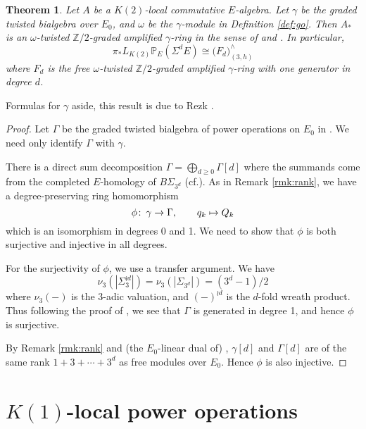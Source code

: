 \documentclass{gtpart}
\newtheorem{thm}{Theorem}
\theoremstyle{definition}
\theoremstyle{remark}
\def\co{\colon\thinspace}
\newcommand{\mb}[1]{\mathbb{#1}}
\newcommand{\cf}{cf.\thinspace}
\newcommand{\BP}{{\mb P}}
\newcommand{\BZ}{{\mb Z}}
\newcommand{\G}{\Gamma}
\newcommand{\g}{\gamma}
\begin{document}
\begin{thm}
\label{thm:gamma}
 Let $A$ be a $K(2)$-local commutative $E$-algebra.  
 Let $\g$ be the graded twisted bialgebra over $E_0$, and $\omega$ be the $\g$-module in Definition \ref{def:go}.  
 Then $A_*$ is an {\em $\omega$-twisted $\BZ/2$-graded amplified $\g$-ring} in the sense of \cite[Section 2]{cong} and \cite[2.5 and 2.6]{h2p2}.  In particular, 
 \[
  \pi_* L_{K(2)} \BP_E (\Sigma^d E) \cong \big( F_d \big)_{(3,h)}^\wedge 
 \]
 where $F_d$ is the free $\omega$-twisted $\BZ/2$-graded amplified $\g$-ring with one generator in degree $d$.  
\end{thm}
Formulas for $\g$ aside, this result is due to Rezk \cite{cong, h2p2}.  
\begin{proof}
 Let $\G$ be the graded twisted bialgebra of power operations on $E_0$ in \cite[Section 6]{cong}.  
 We need only identify $\G$ with $\g$.  

 There is a direct sum decomposition $\G = \bigoplus_{d \geq 0} \G[d]$ 
 where the summands come from the completed $E$-homology of $B\Sigma_{3^d}$ (\cf \cite[6.2]{cong}).  
 As in Remark \ref{rmk:rank}, we have a degree-preserving ring homomorphism 
 \[
  \phi \co \g \to \G, \qquad q_k \mapsto Q_k 
 \]
 which is an isomorphism in degrees 0 and 1.  
 We need to show that $\phi$ is both surjective and injective in all degrees.  

 For the surjectivity of $\phi$, we use a transfer argument.  
 We have 
 \[
  \nu_3(|\Sigma_3^{\wr d}|) = \nu_3(|\Sigma_{3^d}|) = (3^d - 1) / 2 
 \]
 where $\nu_3(-)$ is the 3-adic valuation, and $(-)^{\wr d}$ is the $d$-fold wreath product.  
 Thus following the proof of \cite[Proposition 3.17]{cong}, 
 we see that $\G$ is generated in degree 1, and hence $\phi$ is surjective.  

 By Remark \ref{rmk:rank} and (the $E_0$-linear dual of) \cite[Theorem 1.1]{Str98}, 
 $\g[d]$ and $\G[d]$ are of the same rank $1 + 3 + \cdots + 3^d$ as free modules over $E_0$.  
 Hence $\phi$ is also injective.  
\end{proof}


\section{$K(1)$-local power operations}
\label{sec:K(1)}
\end{document}
